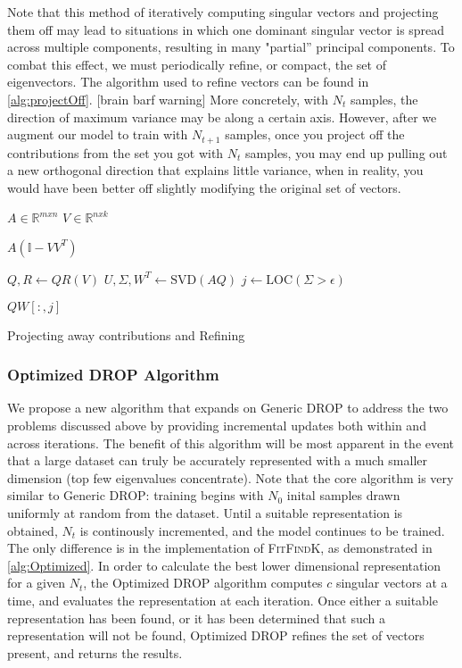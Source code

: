 Note that this method of iteratively computing singular vectors and projecting them off may lead to situations in which one dominant singular vector is spread across multiple components, resulting in many "partial'' principal components. To combat this effect, we must periodically refine, or compact, the set of eigenvectors. The algorithm used to refine vectors can be found in \ref{alg:projectOff}. [brain barf warning] More concretely, with $N_t$ samples, the direction of maximum variance may be along a certain axis. However, after we augment our model to train with $N_{t+1}$ samples, once you project off the contributions from the set you got with $N_t$ samples, you may end up pulling out a new orthogonal direction that explains little variance, when in reality, you would have been better off slightly modifying the original set of vectors. 

\begin{algorithm}
\begin{algorithmic}
\State $A \in \mathbb{R}^{mxn}$
\State $V \in  \mathbb{R}^{nxk}$
	

	\Return $A(\mathbb{I} - VV^T)$
\EndFunction


	\State $Q, R \gets QR(V)$
	\State $U, \Sigma, W^T \gets \text{SVD}(AQ)$ 
	\State $j \gets \text{LOC}(\Sigma > \epsilon)$
		
	\Return $QW[:,j]$
\EndFunction
\end{algorithmic}
\caption{Projecting away contributions and Refining}
\label{alg:projectOff}
\end{algorithm}

\subsubsection{Optimized DROP Algorithm}
We propose a new algorithm that expands on Generic DROP to address the two problems discussed above by providing incremental updates both within and across iterations. The benefit of this algorithm will be most apparent in the event that a large dataset can truly be accurately represented with a much smaller dimension (top few eigenvalues concentrate). Note that the core algorithm is very similar to Generic DROP: training begins with $N_0$ inital samples drawn uniformly at random from the dataset. Until a suitable representation is obtained, $N_t$ is continously incremented, and the model continues to be trained. The only difference is in the implementation of \textsc{FitFindK}, as demonstrated in \ref{alg:Optimized}. In order to calculate the best lower dimensional representation for a given $N_t$, the Optimized DROP algorithm computes $c$ singular vectors at a time, and evaluates the representation at each iteration. Once either a suitable representation has been found, or it has been determined that such a representation will not be found, Optimized DROP refines the set of vectors present, and returns the results. 


